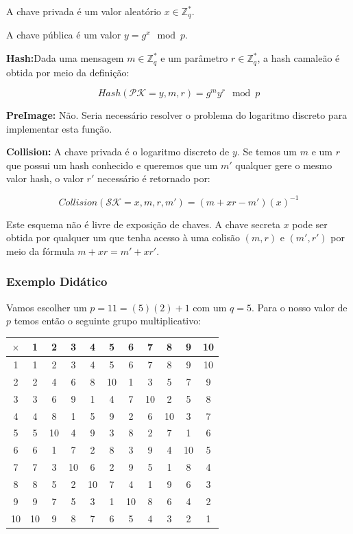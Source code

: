 \documentclass[a4paper]{article}
\begin{document}
A chave privada é um valor aleatório $x \in \mathbb{Z}^{*}_q$.

A chave pública é um valor $y = g^x \mod p$.

\textbf{Hash:}Dada uma mensagem $m \in \mathbb{Z}^{*}_q$ e um
parâmetro $r\in \mathbb{Z}^{*}_q$, a hash camaleão é obtida por meio
da definição:

$$
Hash(\mathcal{PK}=y, m, r) = g^my^r \mod p
$$

\textbf{PreImage:} Não. Seria necessário resolver o problema do
logaritmo discreto para implementar esta função.

\textbf{Collision:} A chave privada é o logaritmo discreto de $y$. Se
temos um $m$ e um $r$ que possui um hash conhecido e queremos que um
$m'$ qualquer gere o mesmo valor hash, o valor $r'$ necessário é
retornado por:

$$
Collision(\mathcal{SK}=x, m, r, m') = (m+xr-m')(x)^{-1}
$$

Este esquema não é livre de exposição de chaves. A chave secreta $x$
pode ser obtida por qualquer um que tenha acesso à uma colisão $(m,
r)$ e $(m', r')$ por meio da fórmula $m+xr = m'+xr'$.




  

\subsubsection{Exemplo Didático}

Vamos escolher um $p=11=(5)(2)+1$ com um $q=5$. Para o nosso valor de
$p$ temos então o seguinte grupo multiplicativo:

\begin{tabular}{|c||c|c|c|c|c|c|c|c|c|c|}
  \hline
$\times$&1&2&3&4&5&6&7&8&9&10\\
  \hline
  \hline
1&1&2&3&4&5&6&7&8&9&10\\
\hline
2&2&4&6&8&10&1&3&5&7&9\\
\hline
3&3&6&9&1&4&7&10&2&5&8\\
\hline
4&4&8&1&5&9&2&6&10&3&7\\
\hline
5&5&10&4&9&3&8&2&7&1&6\\
\hline
6&6&1&7&2&8&3&9&4&10&5\\
\hline
7&7&3&10&6&2&9&5&1&8&4\\
\hline
8&8&5&2&10&7&4&1&9&6&3\\
\hline
9&9&7&5&3&1&10&8&6&4&2\\
\hline
10&10&9&8&7&6&5&4&3&2&1\\
\hline
\end{tabular}
\end{document}
